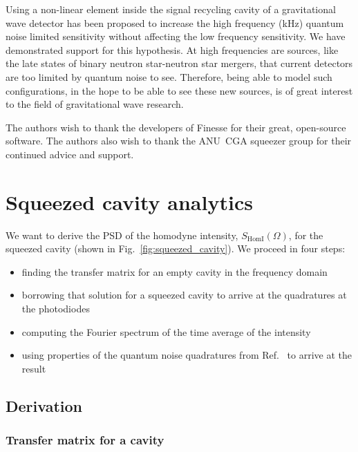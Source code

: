 \documentclass[aps,pra,superscriptaddress,reprint,nofootinbib]{revtex4-1}
\begin{document}
Using a non-linear element inside the signal recycling cavity of a gravitational wave detector has been proposed to increase the high frequency (kHz) quantum noise limited sensitivity without affecting the low frequency sensitivity. We have demonstrated support for this hypothesis. At high frequencies are sources, like the late states of binary neutron star-neutron star mergers, that current detectors are too limited by quantum noise to see. Therefore, being able to model such configurations, in the hope to be able to see these new sources, is of great interest to the field of gravitational wave research.


\begin{acknowledgments}
The authors wish to thank the developers of Finesse for their great, open-source software.
The authors also wish to thank the ANU~CGA squeezer group for their continued advice and support.

\end{acknowledgments}


\appendix
\section{Squeezed cavity analytics}
\label{app:squeezed_cavity_analytics}

We want to derive the PSD of the homodyne intensity, $S_{\mathrm{HomI}}(\Omega)$, for the squeezed cavity (shown in Fig.~\ref{fig:squeezed_cavity}). We proceed in four steps:
\begin{itemize}
\item finding the transfer matrix for an empty cavity in the frequency domain
\item borrowing that solution for a squeezed cavity to arrive at the quadratures at the photodiodes
\item computing the Fourier spectrum of the time average of the intensity
\item using properties of the quantum noise quadratures from Ref.~\cite{Danilishin_2012} to arrive at the result
\end{itemize}

\subsection{Derivation}

\subsubsection{Transfer matrix for a cavity}
\end{document}
